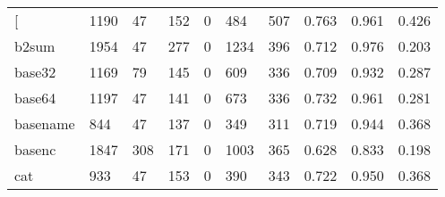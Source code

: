 \begin{longtable}{lp{1.3cm}p{1.3cm}p{1.3cm}p{1.3cm}p{1.3cm}p{1.3cm}p{1.3cm}p{1.3cm}p{1.3cm}}
\bottomrule
\endlastfoot
{[}         &                   1190 &                                 47 &                               152 &                                0 &                               484 &                             507 &                                   0.763 &                                  0.961 &                                0.426 \\
b2sum     &                   1954 &                                 47 &                               277 &                                0 &                              1234 &                             396 &                                   0.712 &                                  0.976 &                                0.203 \\
base32    &                   1169 &                                 79 &                               145 &                                0 &                               609 &                             336 &                                   0.709 &                                  0.932 &                                0.287 \\
base64    &                   1197 &                                 47 &                               141 &                                0 &                               673 &                             336 &                                   0.732 &                                  0.961 &                                0.281 \\
basename  &                    844 &                                 47 &                               137 &                                0 &                               349 &                             311 &                                   0.719 &                                  0.944 &                                0.368 \\
basenc    &                   1847 &                                308 &                               171 &                                0 &                              1003 &                             365 &                                   0.628 &                                  0.833 &                                0.198 \\
cat       &                    933 &                                 47 &                               153 &                                0 &                               390 &                             343 &                                   0.722 &                                  0.950 &                                0.368 \\

\end{longtable}
